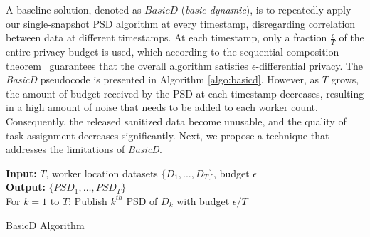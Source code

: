 \documentclass{USC-Thesis}
\numberwithin{equation}{chapter}
\begin{document}
A baseline solution, denoted as $\mathit{BasicD}$ ({\em basic dynamic}), is to repeatedly apply our single-snapshot PSD algorithm at every timestamp, disregarding correlation between data at different timestamps.  At each timestamp, only a fraction $\frac{\epsilon}{T}$ of the entire privacy budget is used, which according to the sequential composition theorem~\cite{cormode2012differentially} guarantees that the overall algorithm satisfies $\epsilon$-differential privacy. The {\em BasicD} pseudocode is presented in Algorithm \ref{algo:basicd}.  However, as $T$ grows, the amount of budget received by the PSD at each timestamp decreases, resulting in a high amount of noise that needs to be added to each worker count. Consequently, the released sanitized data become unusable, and the quality of task assignment decreases significantly. Next, we propose a technique that addresses the limitations of {\em BasicD}. 

\begin{comment}
\begin{algorithm}[ht]
\small
\begin{algorithmic}[1]
\STATE \textbf{Input:} $T$, worker location datasets $\{D_1, ..., D_T\}$, budget $\epsilon$ \\
\STATE \textbf{Output:} $\mathit{PSD_1}$ \\
\STATE  Publish $PSD_1$ of $D_1$ with budget $\epsilon$\\
\end{algorithmic}
\caption{BasicS Algorithm} \label{algo:basics}
\end{algorithm}
\end{comment}

\begin{algorithm}[ht]
\small
\begin{algorithmic}[1]
\STATE \textbf{Input:} $T$, worker location datasets $\{D_1, ..., D_T\}$, budget $\epsilon$\\
\STATE \textbf{Output:} $\{\mathit{PSD_1}, \ldots, \mathit{PSD_T} \}$ \\
\STATE For $k=1$ to $T$:
\STATE \hspace*{4mm} Publish $k^{th}$ PSD of $D_k$ with budget $\epsilon/T$\\
\end{algorithmic}
\caption{BasicD Algorithm} \label{algo:basicd}
\end{algorithm}
\end{document}
